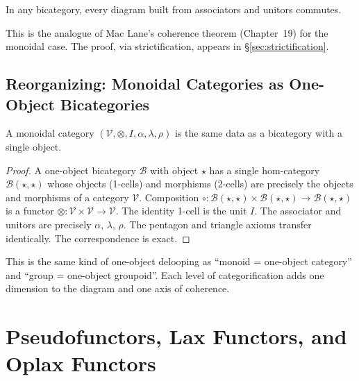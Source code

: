 \begin{proposition}
\label{prop:bicat-coherence}
In any bicategory, every diagram built from associators and unitors commutes.
\end{proposition}

This is the analogue of Mac Lane's coherence theorem (Chapter~19) for the
monoidal case. The proof, via strictification, appears in
\S\ref{sec:strictification}.

\subsection{Reorganizing: Monoidal Categories as One-Object Bicategories}

\begin{proposition}
A monoidal category $(\mathcal{V}, \otimes, I, \alpha, \lambda, \rho)$ is the
same data as a bicategory with a single object.
\end{proposition}

\begin{proof}
A one-object bicategory $\mathcal{B}$ with object $\star$ has a single
hom-category $\mathcal{B}(\star, \star)$ whose objects (1-cells) and morphisms
(2-cells) are precisely the objects and morphisms of a category $\mathcal{V}$.
Composition $\circ : \mathcal{B}(\star,\star) \times \mathcal{B}(\star,\star)
\to \mathcal{B}(\star,\star)$ is a functor $\otimes : \mathcal{V} \times
\mathcal{V} \to \mathcal{V}$. The identity 1-cell is the unit $I$. The
associator and unitors are precisely $\alpha$, $\lambda$, $\rho$. The pentagon
and triangle axioms transfer identically. The correspondence is exact.
\end{proof}

\begin{remark}
This is the same kind of one-object delooping as ``monoid = one-object
category'' and ``group = one-object groupoid''. Each level of categorification
adds one dimension to the diagram and one axis of coherence.
\end{remark}


\section{Pseudofunctors, Lax Functors, and Oplax Functors}
\label{sec:pseudofunctors}

